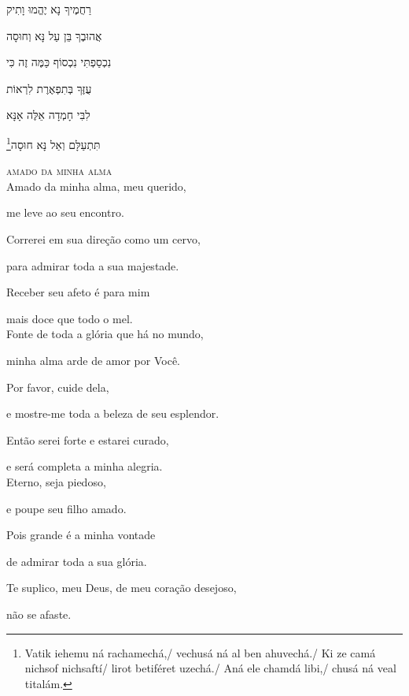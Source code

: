רַחֲמֶיךָ נָא יֶהֱמוּ וָתִיק

אֲהוּבֶךָ בֵּן עַל נָּא וְחוּסָה

נִכְסַפְתִּי נִכְסוֹף כַּמֶּה זֶה כִּי

עֻזֶּךָ בְּתִפְאֶרֶת לִרְאוֹת

לִבִּי חָמְדָה אֵלֶּה אָנָּא

\footnote{Vatik iehemu ná rachamechá,/ vechusá ná al ben ahuvechá./ Ki ze camá nichsof nichsaftí/ lirot betiféret uzechá./ Aná ele chamdá libi,/ chusá ná veal titalám.}תִּתְעַלָּם וְאַל נָּא חוּסָה\\[10pt]



\movetooddpage
\raggedright

\vspace*{1cm}

\textsc{amado da minha alma}\\[15pt]

Amado da minha alma, meu querido,

me leve ao seu encontro.

Correrei em sua direção como um cervo,

para admirar toda a sua majestade.

Receber seu afeto é para mim

mais doce que todo o mel.\\[10pt]

Fonte de toda a glória que há no mundo,

minha alma arde de amor por Você.

Por favor, cuide dela,

e mostre-me toda a beleza de seu esplendor.

Então serei forte e estarei curado,

e será completa a minha alegria.\\[10pt]

Eterno, seja piedoso,

e poupe seu filho amado.

Pois grande é a minha vontade

de admirar toda a sua glória.

Te suplico, meu Deus, de meu coração desejoso,

não se afaste.\\[10pt]



\movetoevenpage
\raggedleft %

\vspace*{1cm}


